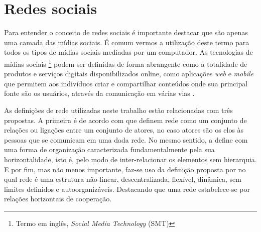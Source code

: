%
%
%
\section{Redes sociais}
\label{rede-social}

Para entender o conceito de redes sociais é importante destacar que são apenas uma camada das mídias sociais. É comum vermos a utilização deste termo para todos os tipos de mídias sociais mediadas por um computador. As tecnologias de mídias sociais \footnote{Termo em inglês, \textit{Social Media Technology} (SMT)} podem ser definidas de forma abrangente como a totalidade de produtos e serviços digitais disponibilizados online, como aplicações \textit{web} e \textit{mobile} que permitem aos indivíduos criar e compartilhar conteúdos onde sua principal fonte são os usuários, através da comunicação em várias vias \cite{davis2012social}.

As definições de rede utilizadas neste trabalho estão relacionadas com três propostas. A primeira é de acordo com  que definem rede como um conjunto de relações ou ligações entre um conjunto de atores, no caso atores são os elos às pessoas que se comunicam em uma dada rede. No mesmo sentido,  a define com uma forma de organização caracterizada fundamentalmente pela sua horizontalidade, isto é, pelo modo de inter-relacionar os elementos sem hierarquia. E por fim, mas não menos importante, faz-se uso da definição proposta por  no qual rede é uma estrutura não-linear, descentralizada, flexível, dinâmica, sem limites definidos e autoorganizáveis. Destacando que uma rede estabelece-se por relações horizontais de cooperação.


